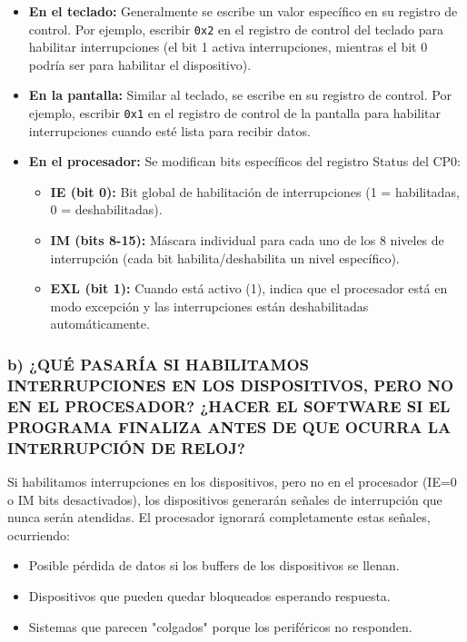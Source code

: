 \documentclass[12pt]{article}
\begin{document}
\begin{itemize}
    \item \textbf{En el teclado:} Generalmente se escribe un valor específico en su registro de control. Por ejemplo, escribir \texttt{0x2} en el registro de control del teclado para habilitar interrupciones (el bit 1 activa interrupciones, mientras el bit 0 podría ser para habilitar el dispositivo).
    
    \item \textbf{En la pantalla:} Similar al teclado, se escribe en su registro de control. Por ejemplo, escribir \texttt{0x1} en el registro de control de la pantalla para habilitar interrupciones cuando esté lista para recibir datos.
    
    \item \textbf{En el procesador:} Se modifican bits específicos del registro Status del CP0:
    \begin{itemize}
        \item \textbf{IE (bit 0):} Bit global de habilitación de interrupciones (1 = habilitadas, 0 = deshabilitadas).
        \item \textbf{IM (bits 8-15):} Máscara individual para cada uno de los 8 niveles de interrupción (cada bit habilita/deshabilita un nivel específico).
        \item \textbf{EXL (bit 1):} Cuando está activo (1), indica que el procesador está en modo excepción y las interrupciones están deshabilitadas automáticamente.
    \end{itemize}
\end{itemize}

\subsubsection*{b) ¿QUÉ PASARÍA SI HABILITAMOS INTERRUPCIONES EN LOS DISPOSITIVOS, PERO NO EN EL PROCESADOR? ¿HACER EL SOFTWARE SI EL PROGRAMA FINALIZA ANTES DE QUE OCURRA LA INTERRUPCIÓN DE RELOJ?}

Si habilitamos interrupciones en los dispositivos, pero no en el procesador (IE=0 o IM bits desactivados), los dispositivos generarán señales de interrupción que nunca serán atendidas. El procesador ignorará completamente estas señales, ocurriendo:
\begin{itemize}
    \item Posible pérdida de datos si los buffers de los dispositivos se llenan.
    \item Dispositivos que pueden quedar bloqueados esperando respuesta.
    \item Sistemas que parecen "colgados" porque los periféricos no responden.
\end{itemize}
\end{document}
